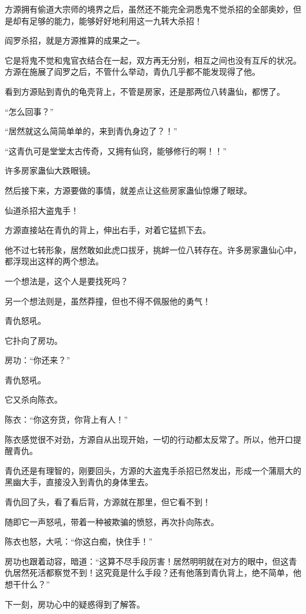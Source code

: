 \begin{this_body}
方源拥有偷道大宗师的境界之后，虽然还不能完全洞悉鬼不觉杀招的全部奥妙，但是却有足够的能力，能够好好地利用这一九转大杀招！

阎罗杀招，就是方源推算的成果之一。

它是将鬼不觉和鬼官衣结合在一起，双方再无分别，相互之间也没有互斥的状况。方源在施展了阎罗之后，不管什么举动，青仇几乎都不能发现得了他。

看到方源贴到青仇的龟壳背上，不管是房家，还是那两位八转蛊仙，都愣了。

“怎么回事？”

“居然就这么简简单单的，来到青仇身边了？！”

“这青仇可是堂堂太古传奇，又拥有仙窍，能够修行的啊！！”

许多房家蛊仙大跌眼镜。

然后接下来，方源要做的事情，就差点让这些房家蛊仙惊爆了眼球。

仙道杀招大盗鬼手！

方源直接站在青仇的背上，伸出右手，对着它猛抓下去。

他不过七转形象，居然敢如此虎口拔牙，挑衅一位八转存在。许多房家蛊仙心中，都浮现出这样的两个想法。

一个想法是，这个人是要找死吗？

另一个想法则是，虽然莽撞，但也不得不佩服他的勇气！

青仇怒吼。

它扑向了房功。

房功：“你还来？”

青仇怒吼。

它又杀向陈衣。

陈衣：“你这夯货，你背上有人！”

陈衣感觉很不对劲，方源自从出现开始，一切的行动都太反常了。所以，他开口提醒青仇。

青仇还是有理智的，刚要回头，方源的大盗鬼手杀招已然发出，形成一个蒲扇大的黑幽大手，直接没入到青仇的身体里去。

青仇回了头，看了看后背，方源就在那里，但它看不到！

随即它一声怒吼，带着一种被欺骗的愤怒，再次扑向陈衣。

陈衣也怒，大吼：“你这白痴，快住手！”

房功也跟着动容，暗道：“这算不尽手段厉害！居然明明就在对方的眼中，但这青仇居然死活都察觉不到！这究竟是什么手段？还有他落到青仇背上，绝不简单，他想干什么？”

下一刻，房功心中的疑惑得到了解答。


\end{this_body}

